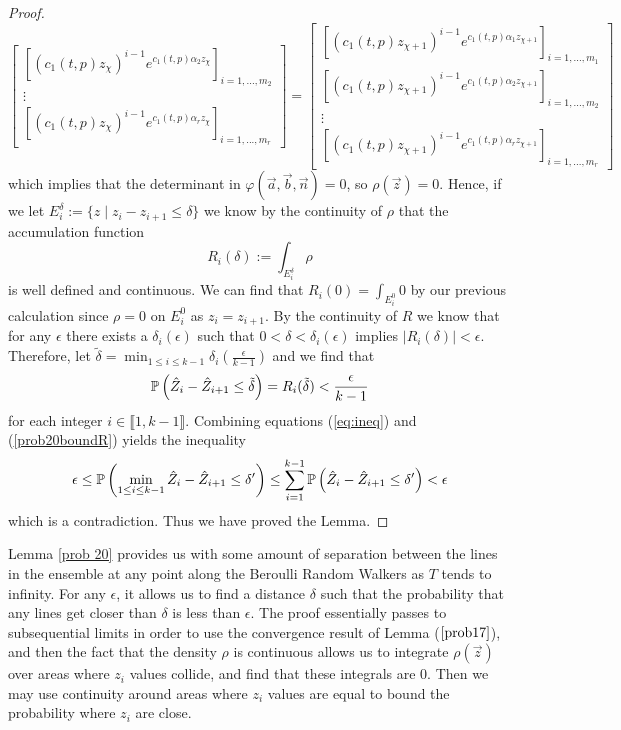 \begin{proof}
\[\begin{bmatrix}
	\left[(c_1(t,p)z_\chi)^{i-1}e^{c_1(t,p)\alpha_2 z_\chi}\right]_{i=1,...,m_2}\\
	\vdots \\
	\left[(c_1(t,p)z_\chi)^{i-1}e^{c_1(t,p)\alpha_r z_\chi}\right]_{i=1,...,m_r}
	\end{bmatrix}=\begin{bmatrix}
	\left[(c_1(t,p)z_{\chi+1})^{i-1}e^{c_1(t,p)\alpha_1 z_{\chi+1}}\right]_{i=1,...,m_1}\\
	\left[(c_1(t,p)z_{\chi+1})^{i-1}e^{c_1(t,p)\alpha_2 z_{\chi+1}}\right]_{i=1,...,m_2}\\
	\vdots \\
	\left[(c_1(t,p)z_{\chi+1})^{i-1}e^{c_1(t,p)\alpha_r z_{\chi+1}}\right]_{i=1,...,m_r}
	\end{bmatrix}\]
	which implies that the determinant in $\varphi(\vec a,\vec b,\vec n)=0$, so $\rho(\vec z)=0$. Hence, if we let $E_i^\delta:=\{z\mid z_i-z_{i+1}\leq\delta\}$ we know by the continuity of $\rho$ that the accumulation function \[R_i(\delta):=\int_{E_i^\delta}\rho\] is well defined and continuous. We can find that $R_i(0)=\int_{E_i^0} 0$ by our previous calculation since $\rho=0$ on $E_i^0$ as $z_i=z_{i+1}$. By the continuity of $R$ we know that for any $\epsilon$ there exists a $\delta_i(\epsilon)$ such that $0<\delta<\delta_i(\epsilon)$ implies $|R_i(\delta)|<\epsilon$. Therefore, let $\tilde\delta=\min_{1\leq i\leq k-1}\delta_i\left(\frac\epsilon{k-1}\right)$ and we find that 
	\begin{equation}
	\label{prob20boundR}
	\mathbb{P}\left( \hat Z_i-\hat Z_{i+1}\leq\tilde\delta \right)=R_i(\tilde\delta)<\frac{\epsilon}{k-1}
	\end{equation}
	for each integer $i\in \llbracket 1,k-1\rrbracket$. Combining equations (\ref{eq:ineq}) and (\ref{prob20boundR}) yields the inequality 
	\[\epsilon\leq \mathbb{P}\left(\min_{1\leq i\leq k-1} \hat Z_i-\hat Z_{i+1}\leq\delta'\right)\leq \sum_{i=1}^{k-1}\mathbb{P}\left(\hat Z_i-\hat Z_{i+1}\leq \delta'\right)< \epsilon
	\]
	which is a contradiction. Thus we have proved the Lemma.
\end{proof}
\begin{remark}
	Lemma \ref{prob 20} provides us with some amount of separation between the lines in the ensemble at any point along the Beroulli Random Walkers as $T$ tends to infinity. For any $\epsilon$, it allows us to find a distance $\delta$ such that the probability that any lines get closer than $\delta$ is less than $\epsilon$. The proof essentially passes to subsequential limits in order to use the convergence result of Lemma ($\ref{prob17}$), and then the fact that the density $\rho$ is continuous allows us to integrate $\rho(\vec z)$ over areas where $z_i$ values collide, and find that these integrals are $0$. Then we may use continuity around areas where $z_i$ values are equal to bound the probability where $z_i$ are close.
\end{remark}
